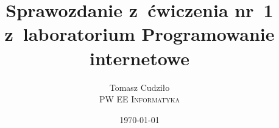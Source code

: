 \documentclass[10pt,a4paper]{article}
\begin{document}
\title{
  Sprawozdanie z~ćwiczenia nr~1\\z~laboratorium Programowanie internetowe
}
\author{
  Tomasz Cudziło\\
  \textsc{PW EE Informatyka}\\[10pt]
}
\date{\today}
\maketitle
\end{document}
